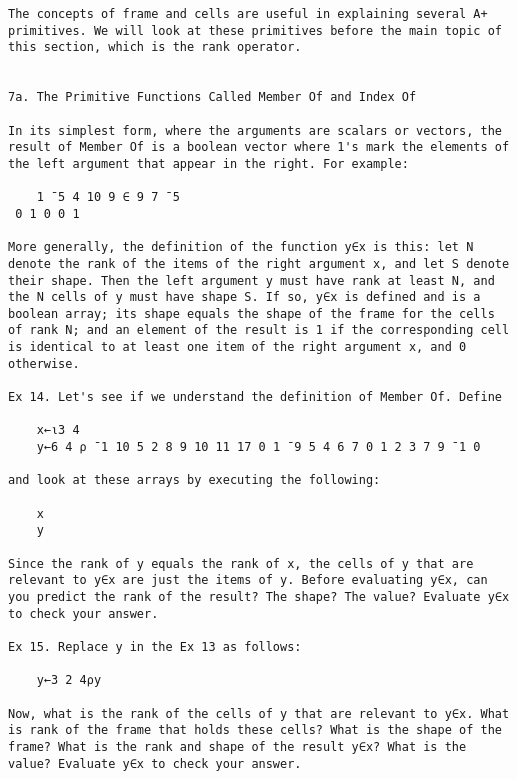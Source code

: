 \documentclass{article}
\begin{document}
\begin{verbatim}
The concepts of frame and cells are useful in explaining several A+   
primitives. We will look at these primitives before the main topic of 
this section, which is the rank operator.                             


7a. The Primitive Functions Called Member Of and Index Of             

In its simplest form, where the arguments are scalars or vectors, the 
result of Member Of is a boolean vector where 1's mark the elements of
the left argument that appear in the right. For example:              

	1 ¯5 4 10 9 ∈ 9 7 ¯5                                                 
 0 1 0 0 1                                                            

More generally, the definition of the function y∈x is this: let N     
denote the rank of the items of the right argument x, and let S denote
their shape. Then the left argument y must have rank at least N, and  
the N cells of y must have shape S. If so, y∈x is defined and is a    
boolean array; its shape equals the shape of the frame for the cells  
of rank N; and an element of the result is 1 if the corresponding cell
is identical to at least one item of the right argument x, and 0      
otherwise.                                                            

Ex 14. Let's see if we understand the definition of Member Of. Define 

	x←⍳3 4                                                               
	y←6 4 ⍴ ¯1 10 5 2 8 9 10 11 17 0 1 ¯9 5 4 6 7 0 1 2 3 7 9 ¯1 0       

and look at these arrays by executing the following:                  

	x                                                                    
	y                                                                    

Since the rank of y equals the rank of x, the cells of y that are     
relevant to y∈x are just the items of y. Before evaluating y∈x, can   
you predict the rank of the result? The shape? The value? Evaluate y∈x
to check your answer.                                                 

Ex 15. Replace y in the Ex 13 as follows:                             

	y←3 2 4⍴y                                                            

Now, what is the rank of the cells of y that are relevant to y∈x. What
is rank of the frame that holds these cells? What is the shape of the 
frame? What is the rank and shape of the result y∈x? What is the      
value? Evaluate y∈x to check your answer.                             


\end{verbatim}
\end{document}
